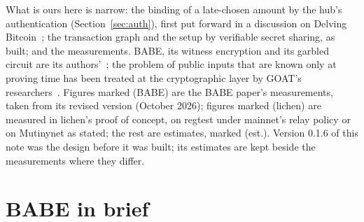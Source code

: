 \documentclass[11pt]{article}
\begin{document}
What is ours here is narrow: the binding of a late-chosen amount by the
hub's authentication (Section~\ref{sec:auth}), first put forward in a
discussion on Delving Bitcoin~\cite{delving}; the transaction graph and
the setup by verifiable secret sharing, as built; and the measurements.
BABE, its witness encryption and its garbled circuit are its
authors'~\cite{babe,gkpw24,argo}; the problem of public inputs that are
known only at proving time has been treated at the cryptographic layer by
GOAT's researchers~\cite{goat}. Figures marked (BABE) are the BABE
paper's measurements, taken from its revised version (October 2026);
figures marked (lichen) are measured in lichen's proof of concept, on
regtest under mainnet's relay policy or on Mutinynet as stated; the rest
are estimates, marked (est.). Version 0.1.6 of this note was the design
before it was built; its estimates are kept beside the measurements where
they differ.

\section{BABE in brief}
\label{sec:babe}
\end{document}
